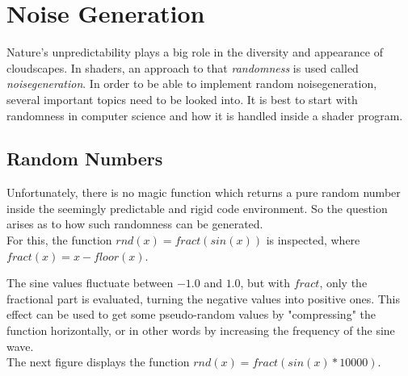 \section{Noise Generation}
\label{section:noise-generation}
Nature's unpredictability plays a big role in the diversity and appearance of cloudscapes. In shaders, an approach to that \textit{randomness} is used called \textit{\gls{noisegeneration}}.
In order to be able to implement random \gls{noisegeneration}, several important topics need to be looked into. It is best to start with randomness in computer science and how it is handled inside a shader program.

\subsection{Random Numbers}
Unfortunately, there is no magic function which returns a pure random number inside the seemingly predictable and rigid code environment.
So the question arises as to how such randomness can be generated.
\\
For this, the function $rnd(x) = fract(sin(x))$ is inspected, where $fract(x) = x - floor(x)$.

\begin{figure}[H]
    \centering
\end{figure}

\noindent
The sine values fluctuate between $-1.0$ and $1.0$, but with $fract$, only the fractional part is evaluated, turning the negative values into positive ones.
This effect can be used to get some pseudo-random values by "compressing" the function horizontally, or in other words by increasing the frequency of the sine wave.
\\
The next figure displays the function $rnd(x) = fract(sin(x) * 10000)$.

